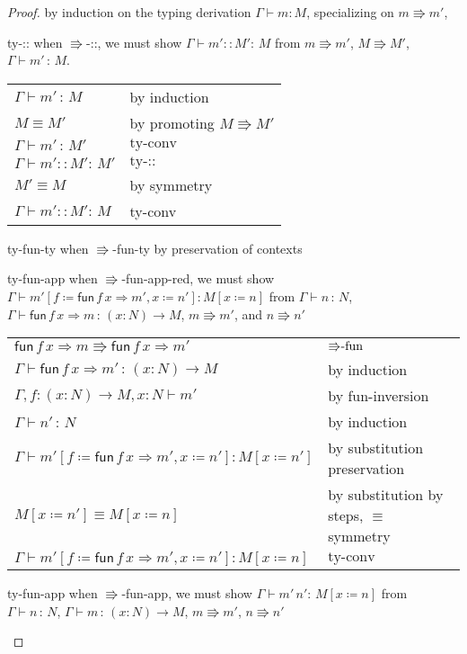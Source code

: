 \begin{proof}
by induction on the typing derivation $\Gamma\vdash m:M$, specializing on $m\Rrightarrow m'$,
\begin{casenv}
  \item \textrm{ty-::} when \textrm{\ensuremath{\Rrightarrow}-::}, we must show $\Gamma\vdash m'::M':\,M$ from $m\Rrightarrow m'$, $M\Rrightarrow M'$, $\Gamma\vdash m'\,:\,M$.
   \begin{tabular}{ll}
    $\Gamma\vdash m'\,:\,M$ & by induction\tabularnewline
    $M\equiv M'$ & by promoting $M\Rrightarrow M'$\tabularnewline
    $\Gamma\vdash m'\,:\,M'$ & $\textrm{ty-conv}$\tabularnewline
    $\Gamma\vdash m'::M':\,M'$ & $\textrm{ty-::}$\tabularnewline
    $M'\equiv M$ & by symmetry\tabularnewline
    $\Gamma\vdash m'::M':\,M$ & \textrm{ty-conv}\tabularnewline
  \end{tabular}
  \item \textrm{ty-fun-ty} when \textrm{\ensuremath{\Rrightarrow}-fun-ty} by preservation of contexts
  \item \textrm{ty-fun-app} when \textrm{\ensuremath{\Rrightarrow}-fun-app-red}, we must show $\Gamma\vdash m'\left[f\coloneqq\mathsf{fun}\,f\,x\Rightarrow m',x\coloneqq n'\right]:M\left[x\coloneqq n\right]$ from $\Gamma\vdash n\,:\,N$, $\Gamma\vdash\mathsf{fun}\,f\,x\Rightarrow m\,:\,\left(x:N\right)\rightarrow M$, $m\Rrightarrow m'$, and $n\Rrightarrow n'$
  \begin{tabular}{ll}
    $\mathsf{fun}\,f\,x\Rightarrow m\Rrightarrow\mathsf{fun}\,f\,x\Rightarrow m'$ & $\textrm{\ensuremath{\Rrightarrow}-fun}$\tabularnewline
    $\Gamma\vdash\mathsf{fun}\,f\,x\Rightarrow m'\,:\,\left(x:N\right)\rightarrow M$ & by induction\tabularnewline
    $\Gamma,f:\left(x:N\right)\rightarrow M,x:N\vdash m'$ & by fun-inversion\tabularnewline
    $\Gamma\vdash n'\,:\,N$ & by induction\tabularnewline
    $\Gamma\vdash m'\left[f\coloneqq\mathsf{fun}\,f\,x\Rightarrow m',x\coloneqq n'\right]:M\left[x\coloneqq n'\right]$ & by substitution preservation \tabularnewline
    $M\left[x\coloneqq n'\right]\equiv M\left[x\coloneqq n\right]$ & by substitution by steps, $\equiv$ symmetry\tabularnewline
    $\Gamma\vdash m'\left[f\coloneqq\mathsf{fun}\,f\,x\Rightarrow m',x\coloneqq n'\right]:M\left[x\coloneqq n\right]$ & $\textrm{ty-conv}$\tabularnewline
  \end{tabular}
  \item \textrm{ty-fun-app} when \textrm{\ensuremath{\Rrightarrow}-fun-app}, we must show $\Gamma\vdash m'\,n':\,M\left[x\coloneqq n\right]$ from $\Gamma\vdash n\,:\,N$, $\Gamma\vdash m\,:\,\left(x:N\right)\rightarrow M$, $m\Rrightarrow m'$, $n\Rrightarrow n'$

\end{casenv}
\end{proof}

